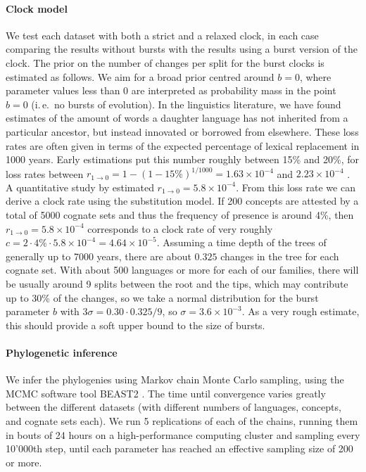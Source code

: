 \documentclass[]{rsos}%
\begin{document}
\paragraph{Clock model}
We test each dataset with both a strict and a relaxed clock, in each case
comparing the results without bursts with the results
using a burst version of the clock. The prior on the number of changes per split for the 
burst clocks is estimated as follows. We aim for a broad prior centred around $b=0$,
where parameter values less than 0 are interpreted as probability mass in the point $b=0$ (i.\,e.\ no  bursts of evolution).
In the linguistics literature, we have found estimates of the amount of words a daughter language has not inherited from a particular ancestor, but instead innovated or borrowed from elsewhere. These loss rates are often
given in terms of the expected percentage of lexical
replacement in 1000 years. Early estimations
put this number roughly between 15\% and 20\%,
for loss rates between
$ r_{1 \rightarrow 0} = 1-(1 - 15\%)^{1/1000} = 1.63 × 10^{-4}$ and $2.23 × 10^{-4}$ \parencite{swadesh1955greater}.
A quantitative study by \textcite[p. 405]{pagel2000history} estimated $r_{1 \rightarrow 0} = 5.8 × 10^{-4}$.
From this loss rate we can derive a clock rate using the substitution model.
If 200 concepts are attested by a total of 5000 cognate sets and thus the frequency of presence is around 4\%, then $r_{1 \rightarrow 0} = 5.8 × 10^{-4}$
corresponds to a clock rate of very roughly $c = 2 \cdot 4\% \cdot 5.8 × 10^{-4}=4.64\times 10^{-5}$.
Assuming a time depth of the trees of generally up to 7000 years,
there are about $0.325$ changes in the tree for each cognate set. With about 500 languages or more for each of our 
families, there will be usually around 9 splits between the root and the
tips, which may contribute up to 30\% \parencite{atkinson2008languages} of the changes, so we take a
normal distribution for the burst parameter $b$ with $3\sigma = 0.30 \cdot 0.325 / 9$, so $\sigma=3.6 \times 10^{-3}$.
As a very rough estimate, this should provide a soft upper bound to the size of bursts.

\paragraph{Phylogenetic inference}
We infer the phylogenies using Markov chain Monte Carlo sampling, using the MCMC
software tool BEAST2 \parencite{drummond2015bayesian}. The time until convergence varies greatly
between the different datasets (with different numbers of languages, concepts, and
cognate sets each).
We run 5 replications of each of the chains, running them in bouts of 24 hours on a high-performance
computing cluster and sampling every 10'000th step, until each parameter has reached an effective sampling size of 
200 or more.
\end{document}
